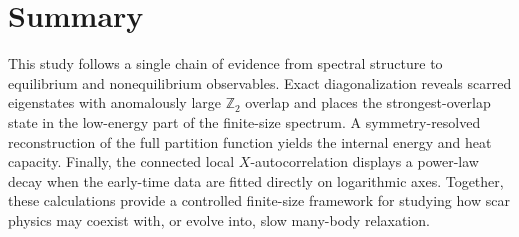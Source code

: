 \documentclass[11pt]{article}
\newcommand{\Ztwo}{\mathbb{Z}_2}
\begin{document}
\section{Summary}

This study follows a single chain of evidence from spectral structure to equilibrium
and nonequilibrium observables. Exact diagonalization reveals scarred eigenstates
with anomalously large $\Ztwo$ overlap and places the strongest-overlap state in the
low-energy part of the finite-size spectrum. A symmetry-resolved reconstruction of
the full partition function yields the internal energy and heat capacity. Finally,
the connected local $X$-autocorrelation displays a power-law decay when the early-time
data are fitted directly on logarithmic axes. Together, these calculations provide
a controlled finite-size framework for studying how scar physics may coexist with,
or evolve into, slow many-body relaxation.
\end{document}
